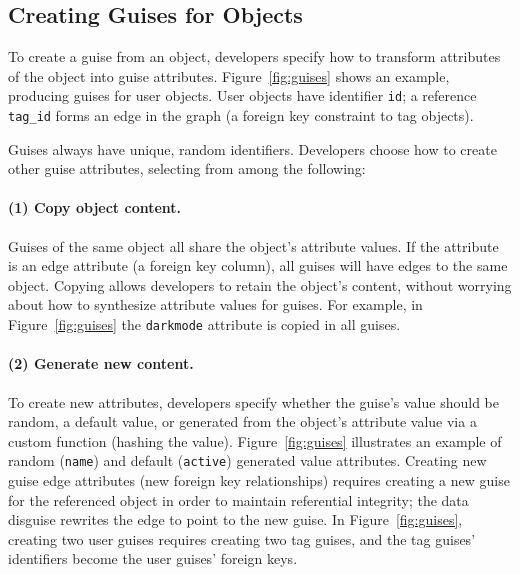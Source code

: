 
\subsection{Creating Guises for Objects}
\label{sec:guises}
%
To create a guise from an object, developers specify how to transform attributes of the
object into guise attributes.
%
Figure~\ref{fig:guises} shows an example, producing guises for user objects.
%
User objects have identifier \texttt{id}; a reference \texttt{tag\_id}
forms an edge in the graph (a foreign key constraint to tag objects).
%

%


%
Guises always have unique, random identifiers.
%
Developers choose how to create other guise attributes, selecting from among the following:
%
\paragraph{(1) Copy object content.}
%
Guises of the same object all share the object's attribute values.
%
If the attribute is an edge attribute (\eg a foreign key column), all guises will have
edges to the same object.
%
%
Copying allows developers to retain the object's content, without worrying about how to
synthesize attribute values for guises.
%
For example, in Figure~\ref{fig:guises} the \texttt{darkmode} attribute is copied in
all guises.

\paragraph{(2) Generate new content.}
%
To create new attributes, developers specify whether the guise's value should be random,
a default value, or generated from the object's attribute value via a custom function (\eg hashing 
the value).
%
Figure~\ref{fig:guises} illustrates an example of random (\texttt{name}) and default
(\texttt{active}) generated value attributes.
%
%
Creating new guise edge attributes (\eg new foreign key relationships) requires
creating a new guise for the referenced object in order to maintain referential
integrity;
the data disguise rewrites the edge to point to the new guise.
%
In Figure~\ref{fig:guises}, creating two user guises requires creating two
tag guises, and the tag guises' identifiers become the user guises' foreign keys.
%


